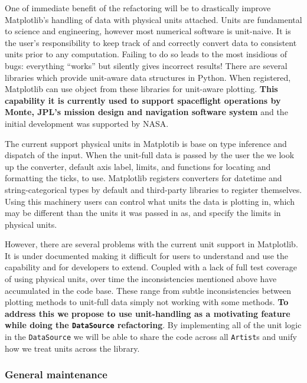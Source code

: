 \documentclass[12pt]{article}
\numberwithin{page}{section}
\begin{document}
One of immediate benefit of the refactoring will be to drastically
improve Matplotlib's handling of data with physical units attached.
Units are fundamental to science and engineering, however most
numerical software is unit-naive.  It is the user's responsibility to
keep track of and correctly convert data to consistent units prior to
any computation.  Failing to do so leads to the most insidious of
bugs: everything ``works'' but silently gives incorrect results!
There are several libraries which provide unit-aware data structures
in Python.  When registered, Matplotlib can use object from these
libraries for unit-aware plotting.  \textbf{This capability it is
  currently used to support spaceflight operations by Monte, JPL's
  mission design and navigation software system} and the initial
development was supported by NASA.


The current support physical units in Matplotib is base on type
inference and dispatch of the input.  When the unit-full data is
passed by the user the we look up the converter, default axis label,
limits, and functions for locating and formatting the ticks, to use.
Matplotlib registers converters for datetime and string-categorical
types by default and third-party libraries to register themselves.
Using this machinery users can control what units the data is plotting
in, which may be different than the units it was passed in as, and
specify the limits in physical units.


However, there are several problems with the current unit support in
Matplotlib.  It is under documented making it difficult for users to
understand and use the capability and for developers to extend.
Coupled with a lack of full test coverage of using physical units,
over time the inconsistencies mentioned above have accumulated in the
code base.  These range from subtle inconsistencies between plotting
methods to unit-full data simply not working with some methods.
\textbf{To address this we propose to use unit-handling as a
  motivating feature while doing the \texttt{DataSource} refactoring}.
By implementing all of the unit logic in the \texttt{DataSource} we
will be able to share the code across all \texttt{Artist}s and unify
how we treat units across the library.


\subsubsection{General maintenance}
\end{document}
